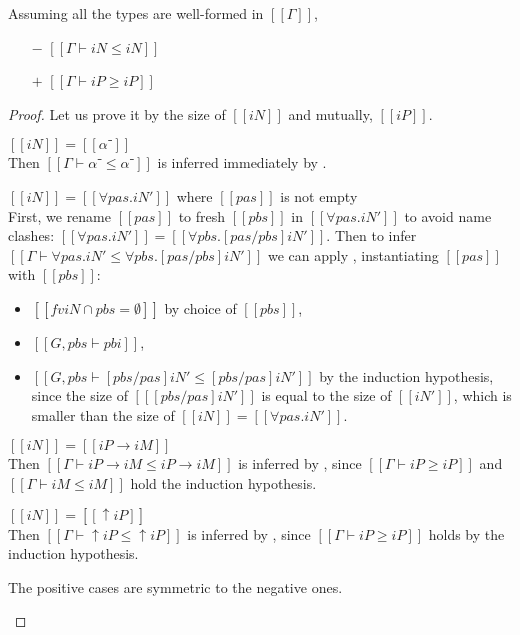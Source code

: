 \begin{lemma} \label{lemma:subtyping-reflexivity}
  Assuming all the types are well-formed in $[[Γ]]$,
  \begin{itemize}
    \item [$-$] $[[Γ ⊢ iN ≤ iN]]$
    \item [$+$] $[[Γ ⊢ iP ≥ iP]]$
  \end{itemize}
\end{lemma}
\begin{proof}
  Let us prove it by the size of $[[iN]]$ and mutually, $[[iP]]$.
  \begin{caseof}
    \item $[[iN]] = [[α⁻]]$\\
      Then $[[Γ ⊢ α⁻ ≤ α⁻]]$ is inferred immediately by .
    \item $[[iN]] = [[∀pas.iN']]$ where $[[pas]]$ is not empty\\
      First, we rename $[[pas]]$ to fresh $[[pbs]]$ in $[[∀pas.iN']]$ to avoid
      name clashes: $[[∀pas.iN']] = [[∀pbs.[pas/pbs]iN']]$.
      Then to infer $[[Γ ⊢ ∀pas.iN' ≤ ∀pbs.[pas/pbs]iN']]$ we can apply 
      , instantiating $[[pas]]$ with $[[pbs]]$:
      \begin{itemize}
        \item $[[fv iN ∩ {pbs} = ∅ ]]$ by choice of $[[pbs]]$,
        \item $[[G, pbs ⊢ pbi]]$,
        \item $[[G, pbs ⊢ [pbs/pas] iN' ≤ [pbs/pas] iN']]$ by the induction hypothesis,
        since the size of $[[ [pbs/pas]iN' ]]$ is equal to the size of $[[iN']]$,
        which is smaller than the size of $[[iN]] = [[∀pas.iN']]$.
      \end{itemize}
    \item $[[iN]] = [[iP → iM]]$\\
      Then $[[Γ ⊢ iP → iM ≤ iP → iM]]$ is inferred by ,
      since $[[Γ ⊢ iP ≥ iP]]$ and $[[Γ ⊢ iM ≤ iM]]$ hold the induction hypothesis. 
    \item $[[iN]] = [[↑iP]]$\\
      Then $[[Γ ⊢ ↑iP ≤ ↑iP]]$ is inferred by ,
      since $[[Γ ⊢ iP ≥ iP]]$ holds by the induction hypothesis.
    \item The positive cases are symmetric to the negative ones.
  \end{caseof}
\end{proof}

